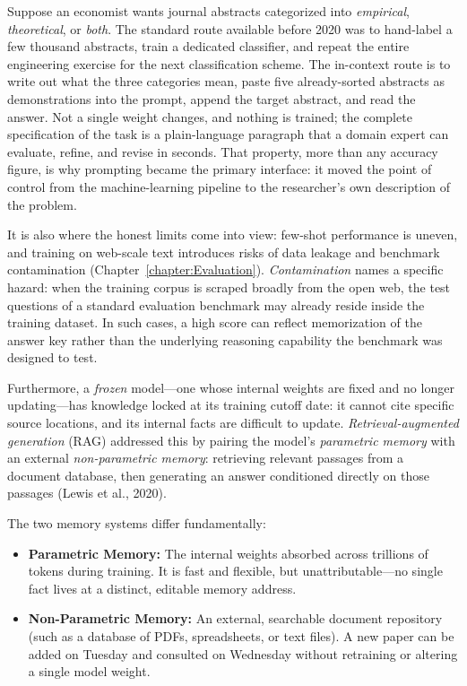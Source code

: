 \begin{example}
Suppose an economist wants journal abstracts categorized into \emph{empirical}, \emph{theoretical}, or \emph{both}.
The standard route available before 2020 was to hand-label a few thousand abstracts, train a dedicated classifier, and repeat the entire engineering exercise for the next classification scheme.
The in-context route is to write out what the three categories mean, paste five already-sorted abstracts as demonstrations into the prompt, append the target abstract, and read the answer.
Not a single weight changes, and nothing is trained; the complete specification of the task is a plain-language paragraph that a domain expert can evaluate, refine, and revise in seconds.
That property, more than any accuracy figure, is why prompting became the primary interface: it moved the point of control from the machine-learning pipeline to the researcher's own description of the problem.
\end{example}

It is also where the honest limits come into view: few-shot performance is uneven, and training on web-scale text introduces risks of data leakage and benchmark contamination (Chapter~\ref{chapter:Evaluation}).
\emph{Contamination} names a specific hazard: when the training corpus is scraped broadly from the open web, the test questions of a standard evaluation benchmark may already reside inside the training dataset.
In such cases, a high score can reflect memorization of the answer key rather than the underlying reasoning capability the benchmark was designed to test.

Furthermore, a \emph{frozen} model—one whose internal weights are fixed and no longer updating—has knowledge locked at its training cutoff date: it cannot cite specific source locations, and its internal facts are difficult to update.
\emph{Retrieval-augmented generation} (RAG) addressed this by pairing the model's \emph{parametric memory} with an external \emph{non-parametric memory}: retrieving relevant passages from a document database, then generating an answer conditioned directly on those passages (Lewis et al., 2020).

The two memory systems differ fundamentally:
\begin{itemize}
    \item \textbf{Parametric Memory:} The internal weights absorbed across trillions of tokens during training. It is fast and flexible, but unattributable—no single fact lives at a distinct, editable memory address.
    \item \textbf{Non-Parametric Memory:} An external, searchable document repository (such as a database of PDFs, spreadsheets, or text files). A new paper can be added on Tuesday and consulted on Wednesday without retraining or altering a single model weight.
\end{itemize}

